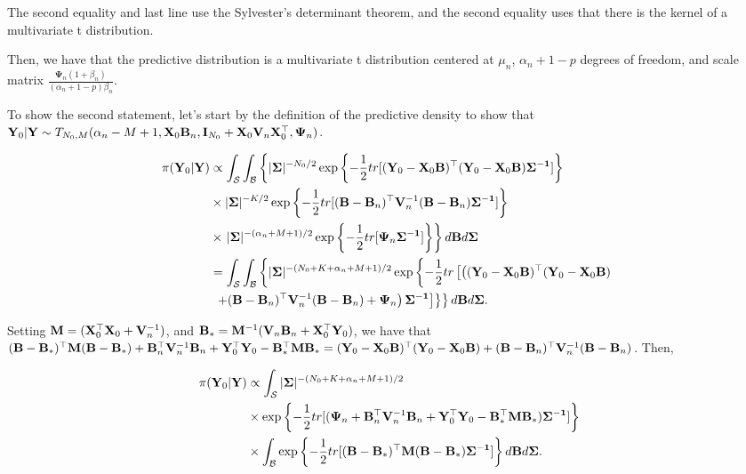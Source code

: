 \begin{enumerate}[leftmargin=*]
The second equality and last line use the Sylvester's determinant theorem, and the second equality uses that there is the kernel of a multivariate t distribution.

Then, we have that the predictive distribution is a multivariate t distribution centered at $\mu_n$, $\alpha_n+1-p$ degrees of freedom, and scale matrix $\frac{\mathbf{\Psi}_n(1+\beta_n)}{(\alpha_n+1-p)\beta_n}$.

To show the second statement, let's start by the definition of the predictive density to show that ${\bf{Y}}_0|{\bf{Y}}\sim T_{N_0,M}(\alpha_n-M+1,{\bf{X}}_0{\bf{B}}_n,{\bf{I}}_{N_0}+{\bf{X}}_0{\bf{V}}_n{\bf{X}}_0^{\top},{\bf{\Psi}}_n)$.

\begin{align*}
	\pi({\bf{Y}}_0|{\bf{Y}})&\propto\int_{\mathcal{S}}\int_{\mathcal{B}}\left\{ |{\bf{\Sigma}}|^{-N_0/2}\exp\left\{-\frac{1}{2}tr[({\bf{Y}}_0-{\bf{X}}_0{\bf{B}})^{\top}({\bf{Y}}_0-{\bf{X}}_0{\bf{B}}){\bf{\Sigma}^{-1}}]\right\}\right.\\
	&\times |{\bf{\Sigma}}|^{-K/2}\exp\left\{-\frac{1}{2}tr[({\bf{B}}-{\bf{B}}_n)^{\top}{\bf{V}}_n^{-1}({\bf{B}}-{\bf{B}}_n){\bf{\Sigma}^{-1}}]\right\}\\
	&\times\left. |{\bf{\Sigma}}|^{-(\alpha_n+M+1)/2}\exp\left\{-\frac{1}{2}tr[{\bf{\Psi}}_n{\bf{\Sigma}^{-1}}]\right\}\right\}d{\bf{B}}d{\bf{\Sigma}}\\
	&=\int_{\mathcal{S}}\int_{\mathcal{B}}\left\{ |{\bf{\Sigma}}|^{-(N_0+K+\alpha_n+M+1)/2}\exp\left\{-\frac{1}{2}tr\left[\left(({\bf{Y}}_0-{\bf{X}}_0{\bf{B}})^{\top}({\bf{Y}}_0-{\bf{X}}_0{\bf{B}})\right.\right.\right.\right.\\
	&\left.\left.\left.\left.+({\bf{B}}-{\bf{B}}_n)^{\top}{\bf{V}}_n^{-1}({\bf{B}}-{\bf{B}}_n)+{\bf{\Psi}}_n\right){\bf{\Sigma}^{-1}}\right]\right\}\right\}d{\bf{B}}d{\bf{\Sigma}}.	 
\end{align*}

Setting ${\bf{M}}=({\bf{X}}_0^{\top}{\bf{X}}_0+{\bf{V}}_n^{-1})$, and ${\bf{B}}_{*}={\bf{M}}^{-1}({\bf{V}}_n{\bf{B}}_n+{\bf{X}}_0^{\top}{\bf{Y}}_0)$, we have that $({\bf{B}}-{\bf{B}}_*)^{\top}{\bf{M}}({\bf{B}}-{\bf{B}}_*)+{\bf{B}}_n^{\top}{\bf{V}}_n^{-1}{\bf{B}}_n+{\bf{Y}}_0^{\top}{\bf{Y}}_0-{\bf{B}}_*^{\top}{\bf{M}}{\bf{B}}_*=({\bf{Y}}_0-{\bf{X}}_0{\bf{B}})^{\top}({\bf{Y}}_0-{\bf{X}}_0{\bf{B}})+({\bf{B}}-{\bf{B}}_n)^{\top}{\bf{V}}_n^{-1}({\bf{B}}-{\bf{B}}_n)$. Then,

\begin{align*}
	\pi({\bf{Y}}_0|{\bf{Y}})&\propto \int_{\mathcal{S}}|{\bf{\Sigma}}|^{-(N_0+K+\alpha_n+M+1)/2}\\
	&\times \exp\left\{-\frac{1}{2}tr[({\bf{\Psi}}_n+{\bf{B}}_n^{\top}{\bf{V}}_n^{-1}{\bf{B}}_n+{\bf{Y}}_0^{\top}{\bf{Y}}_0-{\bf{B}}_*^{\top}{\bf{M}}{\bf{B}}_*){\bf{\Sigma}^{-1}}]\right\}\\
	&\times\int_{\mathcal{B}}\exp\left\{-\frac{1}{2}tr[({\bf{B}}-{\bf{B}}_*)^{\top}{\bf{M}}({\bf{B}}-{\bf{B}}_*){\bf{\Sigma}^{-1}}]\right\}d{\bf{B}}d{\bf{\Sigma}}.
\end{align*} 


\end{enumerate}
